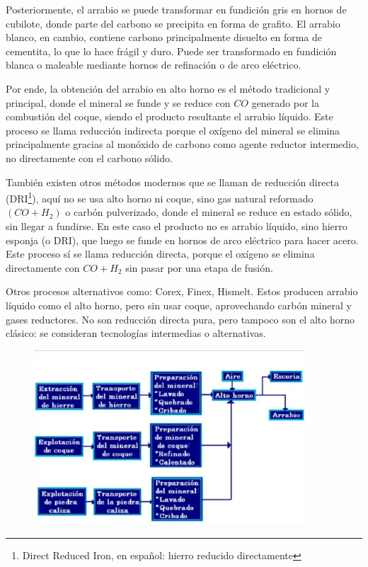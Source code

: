 \documentclass[12pt,a4paper]{article}
\begin{document}
Posteriormente, el arrabio se puede transformar en fundición gris en hornos de cubilote, donde parte del carbono se precipita en forma de grafito.
El arrabio blanco, en cambio, contiene carbono principalmente disuelto en forma de cementita, lo que lo hace frágil y duro. Puede ser transformado en fundición blanca o maleable mediante hornos de refinación o de arco eléctrico.

Por ende, la obtención del arrabio en alto horno es el método tradicional y principal, donde el mineral se funde y se reduce con $CO$ generado por la combustión del coque, siendo el producto resultante el arrabio líquido.
Este proceso se llama reducción indirecta porque el oxígeno del mineral se elimina principalmente gracias al monóxido de carbono como agente reductor intermedio, no directamente con el carbono sólido.

También existen otros métodos modernos que se llaman de reducción directa (DRI\footnote{Direct Reduced Iron, en español: hierro reducido directamente}), aquí no se usa alto horno ni coque, sino gas natural reformado $(CO + H_2)$ o carbón pulverizado, donde el mineral se reduce en estado sólido, sin llegar a fundirse. En este caso el producto no es arrabio líquido, sino hierro esponja (o DRI), que luego se funde en hornos de arco eléctrico para hacer acero. Este proceso sí se llama reducción directa, porque el oxígeno se elimina directamente con $CO + H_2$ sin pasar por una etapa de fusión.

Otros procesos alternativos como: Corex, Finex, Hismelt. Estos producen arrabio líquido como el alto horno, pero sin usar coque, aprovechando carbón mineral y gases reductores. No son reducción directa pura, pero tampoco son el alto horno clásico: se consideran tecnologías intermedias o alternativas.

\begin{figure}[H]    
    \centering         
    \includegraphics[width=0.9\textwidth]{Inagenes para latex/obtencion de arrabio.png}
\end{figure}
\end{document}
